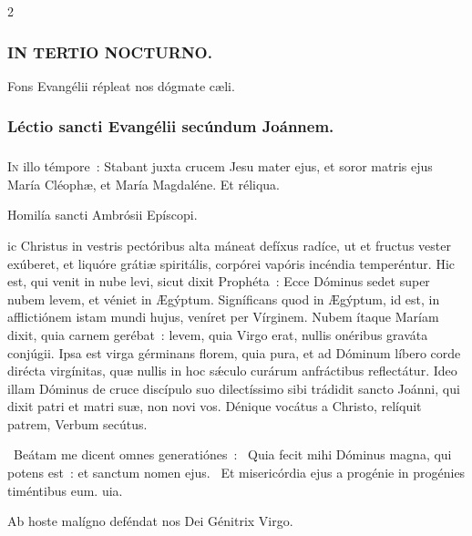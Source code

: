 \documentclass[9pt,twoside]{extarticle}
\begin{document}
\begin{multicols}{2}
\subsubsection*{\center \textsc{IN TERTIO NOCTURNO.}}
\begin{tightlist}{}
\item {\small {} Fons Evangélii répleat nos dógmate cæli.}
\end{tightlist}
\subsubsection*{\center Léctio sancti Evangélii secúndum Joánnem.}
\subsubsection*{\center {}}
\lettrine{I}n illo témpore~: Stabant juxta crucem Jesu mater ejus, et soror matris ejus María Cléophæ, et María Magdaléne. Et réliqua.

\begin{center}Homilía sancti Ambrósii Epíscopi.\\
\end{center}
ic Christus in vestris pectóribus alta máneat defíxus radíce, ut et fructus vester exúberet, et liquóre grátiæ spiritális, corpórei vapóris incéndia temperéntur. Hic est, qui venit in nube levi, sicut dixit Prophéta~: Ecce Dóminus sedet super nubem levem, et véniet in Ægýptum. Signíficans quod in Ægýptum, id est, in afflictiónem istam mundi hujus, veníret per Vírginem. Nubem ítaque Maríam dixit, quia carnem gerébat~: levem, quia Virgo erat, nullis onéribus graváta conjúgii. Ipsa est virga gérminans florem, quia pura, et ad Dóminum líbero corde dirécta virgínitas, quæ nullis in hoc sǽculo curárum anfráctibus reflectátur. Ideo illam Dóminus de cruce discípulo suo dilectíssimo sibi trádidit sancto Joánni, qui dixit patri et matri suæ, non novi vos. Dénique vocátus a Christo, relíquit patrem, Verbum secútus.

\begin{tightlist}{}
\item {}~Beátam me dicent omnes generatiónes~: \textred{*}~Quia fecit mihi Dóminus magna, qui potens est~: et sanctum nomen ejus.
~Et misericórdia ejus a progénie in progénies timéntibus eum. uia.
\item {\small {} Ab hoste malígno deféndat nos Dei Génitrix Virgo.}
\end{tightlist}


\end{multicols}
\end{document}
